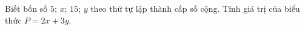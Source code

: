 \begin{ex}
Biết bốn số $5$; $x$; $15$; $y$ theo thứ tự lập thành cấp số cộng. Tính giá trị của biểu thức $P=2x+3y$.
\end{ex}
